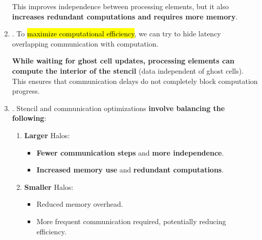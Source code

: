\begin{enumerate}
    This improves independence between processing elements, but it also \textbf{increases redundant computations and requires more memory}.
    

    \item {}. To \hl{maximize computational efficiency}, we can try to hide latency overlapping communication with computation.
    
    \textbf{While waiting for ghost cell updates, processing elements can compute the interior of the stencil} (data independent of ghost cells). This ensures that communication delays do not completely block computation progress.
    
    
    \newpage
    \item {}. Stencil and communication optimizations \textbf{involve balancing the following}:
    \begin{enumerate}
        \item \textbf{Larger} Halos:
        \begin{itemize}
            \item[\textcolor{Green3}{\faIcon{check}}] \textcolor{Green3}{\textbf{Fewer communication steps}} and \textcolor{Green3}{\textbf{more independence}}.
            \item[\textcolor{Red2}{\faIcon{times}}] \textcolor{Red2}{\textbf{Increased memory use}} and \textcolor{Red2}{\textbf{redundant computations}}.
        \end{itemize}

        \item \textbf{Smaller} Halos:
        \begin{itemize}
            \item[\textcolor{Green3}{\faIcon{check}}] Reduced memory overhead.
            \item[\textcolor{Red2}{\faIcon{times}}] More frequent communication required, potentially reducing efficiency.
        \end{itemize}
    \end{enumerate}
\end{enumerate}
